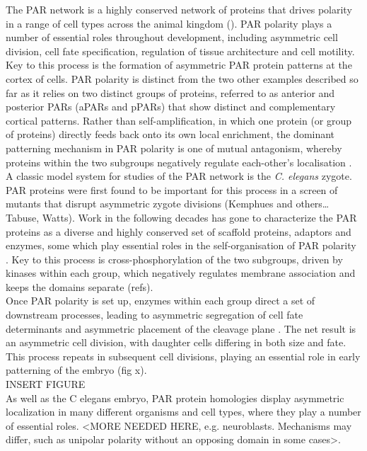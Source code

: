 \documentclass[12pt]{"report"}
\begin{document}
The PAR network is a highly conserved network of proteins that drives polarity in a range of cell types across the animal kingdom (\cite{Goldstein2007}). PAR polarity plays a number of essential roles throughout development, including asymmetric cell division, cell fate specification, regulation of tissue architecture and cell motility. Key to this process is the formation of asymmetric PAR protein patterns at the cortex of cells. PAR polarity is distinct from the two other examples described so far as it relies on two distinct groups of proteins, referred to as anterior and posterior PARs (aPARs and pPARs) that show distinct and complementary cortical patterns. Rather than self-amplification, in which one protein (or group of proteins) directly feeds back onto its own local enrichment, the dominant patterning mechanism in PAR polarity is one of mutual antagonism, whereby proteins within the two subgroups negatively regulate each-other’s localisation \parencite{Goehring2011b}. \\

A classic model system for studies of the PAR network is the \textit{C. elegans} zygote. PAR proteins were first found to be important for this process in a screen of mutants that disrupt asymmetric zygote divisions (Kemphues and others… Tabuse, Watts). Work in the following decades has gone to characterize the PAR proteins as a diverse and highly conserved set of scaffold proteins, adaptors and enzymes, some which play essential roles in the self-organisation of PAR polarity \parencite{Lang2017}. Key to this process is cross-phosphorylation of the two subgroups, driven by kinases within each group, which negatively regulates membrane association and keeps the domains separate (refs).\\

Once PAR polarity is set up, enzymes within each group direct a set of downstream processes, leading to asymmetric segregation of cell fate determinants \citep{Cuenca2003, Daniels2010, Griffin2011, Wu2018} and asymmetric placement of the cleavage plane \parencite{Bouvrais2018}. The net result is an asymmetric cell division, with daughter cells differing in both size and fate. This process repeats in subsequent cell divisions, playing an essential role in early patterning of the embryo (fig x). \\

INSERT FIGURE \\

As well as the C elegans embryo, PAR protein homologies display asymmetric localization in many different organisms and cell types, where they play a number of essential roles. <MORE NEEDED HERE, e.g. neuroblasts. Mechanisms may differ, such as unipolar polarity without an opposing domain in some cases>.\\
\end{document}
